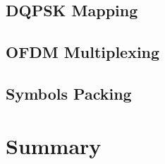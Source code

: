 \documentclass[class=report,11pt,crop=false]{standalone}
\begin{document}
\subsection{DQPSK Mapping \label{subsect:dab-proc_dqpsk-map}}
\subsection{OFDM Multiplexing \label{subsect:dab-proc_ofdm-mux}}
\subsection{Symbols Packing \label{subsect:dab-proc_symbols-pack}}

\section{Summary}

\ifstandalone

\printnoidxglossary[type=\acronymtype,nonumberlist]
\fi
\end{document}
